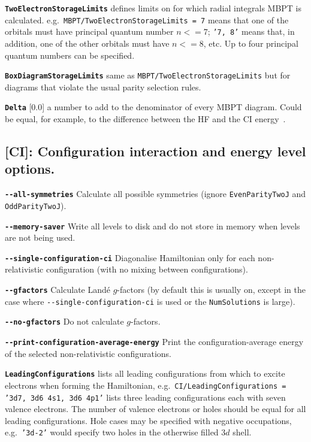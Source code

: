 \documentclass[a4paper,11pt]{article}
\newcommand{\option}[1]{\smallskip\noindent\textbf{\texttt{#1}}}
\newcommand{\code}[1]{\texttt{#1}}
\begin{document}
\option{TwoElectronStorageLimits} defines limits on for which radial integrals MBPT is calculated. e.g.~\texttt{MBPT/TwoElectronStorageLimits = 7} means that one of the orbitals must have principal quantum number $n <= 7$; \texttt{'7, 8'} means that, in addition, one of the other orbitals must have $n <= 8$, etc. Up to four principal quantum numbers can be specified.

\option{BoxDiagramStorageLimits} same as \texttt{MBPT/TwoElectronStorageLimits} but for diagrams that violate the usual parity selection rules.

\option{Delta} [0.0] a number to add to the denominator of every MBPT diagram. Could be equal, for example, to the difference between the HF and the CI energy~\cite{kozlov99os,berengut08jpb}.

\subsection{[CI]: Configuration interaction and energy level options.}

\option{-{}-all-symmetries} Calculate all possible symmetries (ignore \code{EvenParityTwoJ} and \code{OddParityTwoJ}).

\option{-{}-memory-saver} Write all levels to disk and do not store in memory when levels are not being used.

\option{-{}-single-configuration-ci} Diagonalise Hamiltonian only for each non-relativistic configuration (with no mixing between configurations).

\option{-{}-gfactors} Calculate Land\'e $g$-factors (by default this is usually on, except in the case where  \code{-{}-single-configuration-ci} is used or the \code{NumSolutions} is large).

\option{-{}-no-gfactors} Do not calculate $g$-factors.

\option{-{}-print-configuration-average-energy} Print the configuration-average energy of the selected non-relativistic configurations.

\option{LeadingConfigurations} lists all leading configurations from which to excite electrons when forming the Hamiltonian, e.g.~\texttt{CI/LeadingConfigurations = '3d7, 3d6 4s1, 3d6 4p1'} lists three leading configurations each with seven valence electrons. The number of valence electrons or holes should be equal for all leading configurations. Hole cases may be specified with negative occupations, e.g.~\code{'3d-2'} would specify two holes in the otherwise filled $3d$ shell.
\end{document}
